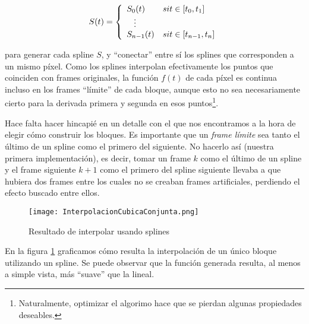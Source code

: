 $$
S(t) = 
\left\{
    \begin{array}{ll}
        S_0(t)  & \mbox{si } t \in [t_{0}, t_1] \\
        \hspace{0.3cm}\vdots \\     
        S_{n - 1}(t) & \mbox{si } t \in [t_{n - 1}, t_n]
    \end{array}
\right.
$$

para generar cada spline $S$, y ``conectar'' entre sí los splines que corresponden a un mismo píxel. Como los splines interpolan efectivamente los puntos que coinciden con frames originales, la función $f(t)$ de cada píxel es continua incluso en los frames ``límite'' de cada bloque, aunque esto no sea necesariamente cierto para la derivada primera y segunda en esos puntos\footnote{Naturalmente, optimizar el algorimo hace que se pierdan algunas propiedades deseables.}.

Hace falta hacer hincapié en un detalle con el que nos encontramos a la hora de elegir cómo construir los bloques. Es importante que un \emph{frame límite} sea tanto el último de un spline como el primero del siguiente. No hacerlo así (nuestra primera implementación), es decir, tomar un frame $k$ como el último de un spline y el frame siguiente $k+1$ como el primero del spline siguiente llevaba a que hubiera dos frames entre los cuales no se creaban frames artificiales, perdiendo el efecto buscado entre ellos.

\begin{figure}[h!]
  \centering
    \texttt{[image: InterpolacionCubicaConjunta.png]}
     \caption{Resultado de interpolar usando splines}\label{fig:intConjuntaSplines}
\end{figure}
\noindent

En la figura \ref{fig:intConjuntaSplines} graficamos cómo resulta la interpolación de un único bloque utilizando un spline. Se puede observar que la función generada resulta, al menos a simple vista, más ``suave'' que la lineal.
